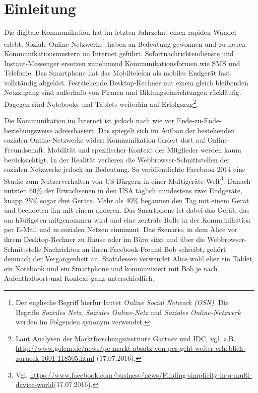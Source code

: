 \chapter{Einleitung}\label{ch:einleitung}
Die digitale Kommunikation hat im letzten Jahrzehnt einen rapiden Wandel erlebt. Soziale Online-Netzwerke\footnote{Der englische Begriff hierfür lautet \textit{Online Social Network (OSN)}. Die Begriffe \textit{Soziales Netz}, \textit{Soziales Online-Netz} und \textit{Soziales Online-Netzwerk} werden im Folgenden synonym verwendet.} haben an Bedeutung gewonnen und zu neuen Kommunikationsmustern im Internet geführt. Sofortnachrichtendienste und Instant-Messenger ersetzen zunehmend Kommunikationsformen wie SMS und Telefonie. Das Smartphone hat das Mobiltelefon als mobiles Endgerät fast vollständig abgelöst. Feststehende Desktop-Rechner mit einem gleich bleibenden Netzzugang sind außerhalb von Firmen und Bildungseinrichtungen rückläufig. Dagegen sind Notebooks und Tablets weiterhin auf Erfolgszug\footnote{Laut Analysen der Marktforschungsinstitute Gartner und IDC, vgl. z.B. \url{http://www.golem.de/news/pc-markt-absatz-von-pcs-geht-weiter-erheblich-zurueck-1601-118505.html} (17.07.2016).}. 

Die Kommunikation im Internet ist jedoch nach wie vor Ende-zu-Ende- beziehungsweise adressbasiert. Das spiegelt sich im Aufbau der bestehenden sozialen Online-Netzwerke wider: Kommunikation basiert dort auf Online-Freundschaft. Mobilität und spezifischer Kontext der Mitglieder werden kaum berücksichtigt. In der Realität verlieren die Web\-brow\-ser-Schnittstellen der sozialen Netzwerke jedoch an Bedeutung. So veröffentlichte Facebook 2014 eine Studie zum Nutzerverhalten von US-Bürgern in einer Multigeräte-Welt\footnote{Vgl. \url{https://www.facebook.com/business/news/Finding-simplicity-in-a-multi-device-world}\newline (17.07.2016).}. Danach nutzten 60\% der Erwachsenen in den USA täglich mindestens zwei Endgeräte, knapp 25\% sogar drei Geräte. Mehr als 40\% begannen den Tag mit einem Gerät und beendeten ihn mit einem anderen. Das Smartphone ist dabei das Gerät, das am häufigsten mitgenommen wird und eine zentrale Rolle in der Kommunikation per E-Mail und in sozialen Netzen einnimmt. Das Szenario, in dem Alice vor ihrem Desktop-Rechner zu Hause oder im Büro sitzt und über die Webbrowser-Schnittstelle Nachrichten an ihren Facebook-Freund Bob schreibt, gehört demnach der Vergangenheit an. Stattdessen verwendet Alice wohl eher ein Tablet, ein Notebook und ein Smartphone und kommuniziert mit Bob je nach Aufenthaltsort und Kontext ganz unterschiedlich. 

